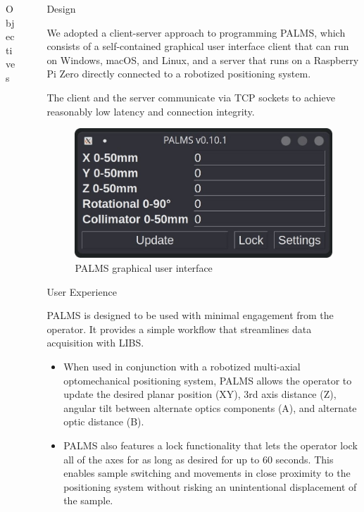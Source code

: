 \documentclass[final, aspectratio=169]{beamer}
\newlength{\sepwidth}
\newlength{\colwidth}
\newcommand{\separatorcolumn}{\begin{column}{\sepwidth}\end{column}}
\begin{document}
\begin{frame}[t]
\begin{columns}[t]
\begin{column}{\colwidth}
\begin{alertblock}{Objectives}
  \end{alertblock}

\end{column}

\separatorcolumn

\begin{column}{\colwidth}

  \begin{block}{Design}

    We adopted a client-server approach to programming PALMS\@, 
    which consists of a self-contained graphical user interface client that can run on 
    Windows, 
    macOS, 
    and Linux, 
    and a server that runs on a Raspberry Pi Zero 
    directly connected to a robotized positioning system.

    The client and the server communicate via TCP sockets to achieve reasonably low latency and connection integrity.

    \begin{figure}
      \centering
      \includegraphics[scale=0.9]{palms-gui}
      \caption{PALMS graphical user interface}
    \end{figure}

  \end{block}

  \begin{block}{User Experience}

    PALMS is designed to be used with minimal engagement from the operator.
    It provides a simple workflow that streamlines data acquisition with LIBS.

    \begin{itemize}
      \item When used in conjunction with a robotized multi-axial optomechanical positioning system, 
      PALMS allows the operator to update the 
      desired planar position (XY), 
      3rd axis distance (Z), 
      angular tilt between alternate optics components (A), 
      and alternate optic distance (B).
      \item PALMS also features a lock functionality that lets the operator lock all of the axes for as long as desired for up to 60 seconds. 
      This enables sample switching 
      and movements in close proximity to the positioning system without risking an unintentional displacement of the sample.


\end{itemize}
\end{block}
\end{column}
\end{columns}
\end{frame}
\end{document}
